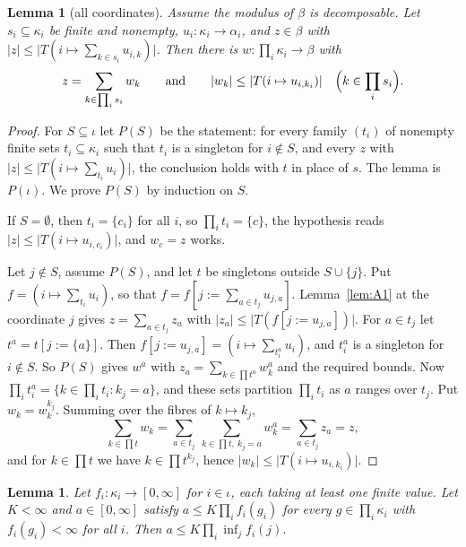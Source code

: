 \documentclass[11pt]{article}
\newtheorem{lemma}[theorem]{Lemma}
\theoremstyle{definition}
\theoremstyle{remark}
\newcommand{\abs}[1]{\lvert #1\rvert}
\newcommand{\upd}[3]{#1[#2 := #3]}
\begin{document}
\begin{lemma}[all coordinates]\label{lem:A2}
  Assume the modulus of \(\beta\) is decomposable. Let \(s_i\subseteq\kappa_i\) be finite and
  nonempty, \(u_i\colon\kappa_i\to\alpha_i\), and \(z\in\beta\) with
  \(\abs{z}\le\abs{T(i\mapsto\sum_{k\in s_i}u_{i,k})}\). Then there is
  \(w\colon\prod_i\kappa_i\to\beta\) with
  \[
    z = \sum_{k\in\prod_i s_i} w_k
    \qquad\text{and}\qquad
    \abs{w_k}\le\abs{T(i\mapsto u_{i,k_i})}\quad\Bigl(k\in\prod_i s_i\Bigr).
  \]
\end{lemma}

\begin{proof}
  For \(S\subseteq\iota\) let \(P(S)\) be the statement: for every family \((t_i)\) of
  nonempty finite sets \(t_i\subseteq\kappa_i\) such that \(t_i\) is a singleton for
  \(i\notin S\), and every \(z\) with \(\abs{z}\le\abs{T(i\mapsto\sum_{t_i}u_i)}\), the
  conclusion holds with \(t\) in place of \(s\). The lemma is \(P(\iota)\). We prove \(P(S)\)
  by induction on \(S\).

  If \(S = \emptyset\), then \(t_i = \{c_i\}\) for all \(i\), so \(\prod_i t_i = \{c\}\), the
  hypothesis reads \(\abs{z}\le\abs{T(i\mapsto u_{i,c_i})}\), and \(w_c = z\) works.

  Let \(j\notin S\), assume \(P(S)\), and let \(t\) be singletons outside \(S\cup\{j\}\). Put
  \(f = (i\mapsto\sum_{t_i}u_i)\), so that \(f = \upd{f}{j}{\sum_{a\in t_j}u_{j,a}}\).
  Lemma~\ref{lem:A1} at the coordinate \(j\) gives \(z = \sum_{a\in t_j}z_a\) with
  \(\abs{z_a}\le\abs{T(\upd{f}{j}{u_{j,a}})}\). For \(a\in t_j\) let
  \(t^a = \upd{t}{j}{\{a\}}\). Then \(\upd{f}{j}{u_{j,a}} = (i\mapsto\sum_{t^a_i}u_i)\), and
  \(t^a_i\) is a singleton for \(i\notin S\). So \(P(S)\) gives \(w^a\) with
  \(z_a = \sum_{k\in\prod t^a}w^a_k\) and the required bounds. Now
  \(\prod_i t^a_i = \{k\in\prod_i t_i : k_j = a\}\), and these sets partition \(\prod_i t_i\)
  as \(a\) ranges over \(t_j\). Put \(w_k = w^{k_j}_k\). Summing over the fibres of
  \(k\mapsto k_j\),
  \[
    \sum_{k\in\prod t}w_k = \sum_{a\in t_j}\ \sum_{k\in\prod t,\ k_j = a}w^a_k
    = \sum_{a\in t_j}z_a = z,
  \]
  and for \(k\in\prod t\) we have \(k\in\prod t^{k_j}\), hence
  \(\abs{w_k}\le\abs{T(i\mapsto u_{i,k_i})}\).
\end{proof}

\begin{lemma}\label{lem:F}
  Let \(f_i\colon\kappa_i\to[0,\infty]\) for \(i\in\iota\), each taking at least one finite
  value. Let \(K<\infty\) and \(a\in[0,\infty]\) satisfy \(a\le K\prod_i f_i(g_i)\) for every
  \(g\in\prod_i\kappa_i\) with \(f_i(g_i)<\infty\) for all \(i\). Then
  \(a\le K\prod_i\inf_j f_i(j)\).
\end{lemma}
\end{document}
